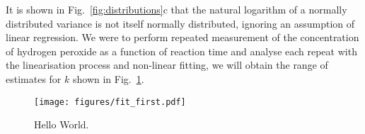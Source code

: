 \documentclass[reprint,superscriptaddress,nobibnotes,amsmath,amssymb]{revtex4-2}
\begin{document}
It is shown in Fig.~\ref{fig:distributions}c that the natural logarithm of a normally distributed variance is not itself normally distributed, ignoring an assumption of linear regression.
We were to perform repeated measurement of the concentration of hydrogen peroxide as a function of reaction time and analyse each repeat with the linearisation process and non-linear fitting, we will obtain the range of estimates for $k$ shown in Fig.~\ref{fig:fit_first}.
%
\begin{figure}
  \texttt{[image: figures/fit\_first.pdf]}
  \caption{
    Hello World.
    }
  \label{fig:fit_first}
\end{figure}
%









\end{document}
